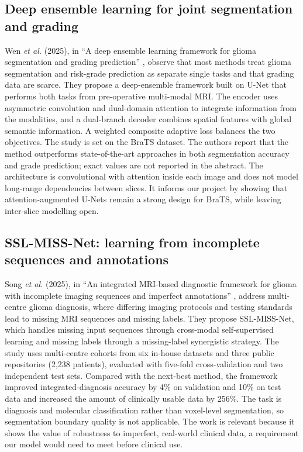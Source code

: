 \subsection{Deep ensemble learning for joint segmentation and grading}
Wen \emph{et al.} (2025), in ``A deep ensemble learning framework for glioma segmentation and grading prediction'' \cite{wen2025}, observe that most methods treat glioma segmentation and risk-grade prediction as separate single tasks and that grading data are scarce. They propose a deep-ensemble framework built on U-Net that performs both tasks from pre-operative multi-modal MRI. The encoder uses asymmetric convolution and dual-domain attention to integrate information from the modalities, and a dual-branch decoder combines spatial features with global semantic information. A weighted composite adaptive loss balances the two objectives. The study is set on the BraTS dataset. The authors report that the method outperforms state-of-the-art approaches in both segmentation accuracy and grade prediction; exact values are not reported in the abstract. The architecture is convolutional with attention inside each image and does not model long-range dependencies between slices. It informs our project by showing that attention-augmented U-Nets remain a strong design for BraTS, while leaving inter-slice modelling open.

\subsection{SSL-MISS-Net: learning from incomplete sequences and annotations}
Song \emph{et al.} (2025), in ``An integrated MRI-based diagnostic framework for glioma with incomplete imaging sequences and imperfect annotations'' \cite{song2025}, address multi-centre glioma diagnosis, where differing imaging protocols and testing standards lead to missing MRI sequences and missing labels. They propose SSL-MISS-Net, which handles missing input sequences through cross-modal self-supervised learning and missing labels through a missing-label synergistic strategy. The study uses multi-centre cohorts from six in-house datasets and three public repositories (2,238 patients), evaluated with five-fold cross-validation and two independent test sets. Compared with the next-best method, the framework improved integrated-diagnosis accuracy by 4\% on validation and 10\% on test data and increased the amount of clinically usable data by 256\%. The task is diagnosis and molecular classification rather than voxel-level segmentation, so segmentation boundary quality is not applicable. The work is relevant because it shows the value of robustness to imperfect, real-world clinical data, a requirement our model would need to meet before clinical use.

